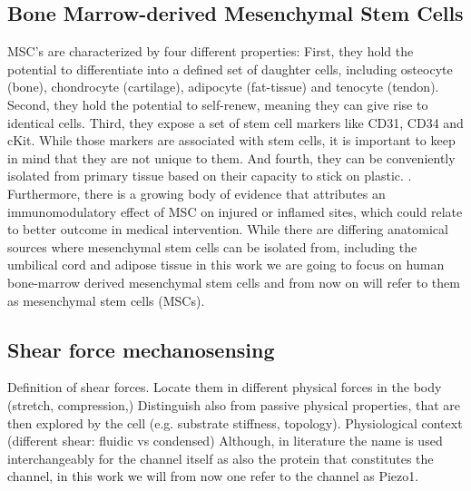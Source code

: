\subsection{Bone Marrow-derived Mesenchymal Stem Cells}
MSC's are characterized by four different properties: First, they hold the potential to differentiate into a defined set of daughter cells, including osteocyte (bone), chondrocyte (cartilage), adipocyte (fat-tissue) and tenocyte (tendon).\cite{Ng2008} Second, they hold the potential to self-renew, meaning they can give rise to identical cells. Third, they expose a set of stem cell markers like CD31, CD34 and cKit. While those markers are associated with stem cells, it is important to keep in mind that they are not unique to them. \cite{Battula2009} And fourth, they can be conveniently isolated from primary tissue based on their capacity to stick on plastic. \cite{Bühring2007}. Furthermore, there is a growing body of evidence that attributes an immunomodulatory effect of MSC on injured or inflamed sites, which could relate to better outcome in medical intervention. \cite{Hass2011, Caplan2011}
While there are differing anatomical sources where mesenchymal stem cells can be isolated from, including the umbilical cord and adipose tissue \cite{Barlow2008, Hass2011} in this work we are going to focus on human bone-marrow derived mesenchymal stem cells and from now on will refer to them as mesenchymal stem cells (MSCs).


\subsection{Shear force mechanosensing}
Definition of shear forces. Locate them in different physical forces in the body (stretch, compression,) Distinguish also from passive physical properties, that are then explored by the cell (e.g. substrate stiffness, topology).
Physiological context (different shear: fluidic vs condensed)
Although, in literature the name \Piezo{} is used interchangeably for the channel itself as also the protein that constitutes the channel, in this work we will from now one refer to the channel as Piezo1.

